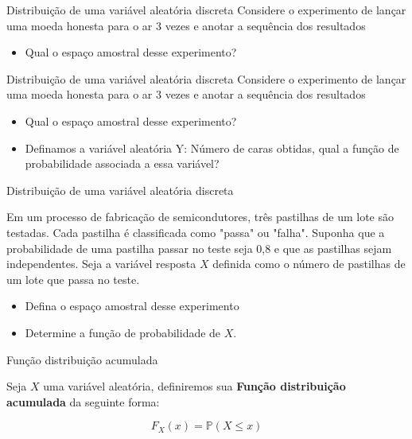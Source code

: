 \begin{frame}{Distribuição de uma variável aleatória discreta}
    Considere o experimento de lançar uma moeda honesta para o ar 3 vezes e anotar a sequência dos resultados

    \begin{itemize}
        \item Qual o espaço amostral desse experimento?
    \end{itemize}
\end{frame}

\begin{frame}{Distribuição de uma variável aleatória discreta}
    Considere o experimento de lançar uma moeda honesta para o ar 3 vezes e anotar a sequência dos resultados

    \begin{itemize}
        \item Qual o espaço amostral desse experimento?
        \item Definamos a variável aleatória Y: Número de caras obtidas, qual a função de probabilidade associada a essa variável?
    \end{itemize}

\end{frame}

\begin{frame}{Distribuição de uma variável aleatória discreta}

\begin{exemplo}[11]
     Em um processo de fabricação de semicondutores, três pastilhas de um lote são testadas. Cada pastilha é classificada como "passa" ou "falha". Suponha que a probabilidade de uma pastilha passar no teste seja 0,8 e que as pastilhas sejam independentes. Seja a variável resposta $X$ definida como o número de pastilhas de um lote que passa no teste. 

     \begin{itemize}
         \item Defina o espaço amostral desse experimento
         \item Determine a função de probabilidade de $X$.
     \end{itemize}
     
\end{exemplo}
   
\end{frame}
\begin{frame}{Função distribuição acumulada}
    \begin{definicao}
        Seja $X$ uma variável aleatória, definiremos sua \textbf{Função distribuição acumulada} da seguinte forma:
        
$$F_X(x) = \mathds{P}(X \leq x)$$
    \end{definicao}
\end{frame}

